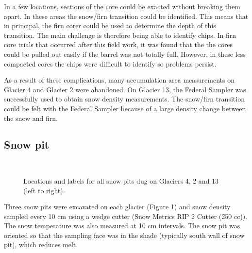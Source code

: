 \documentclass{sfuthesis}
\begin{document}
In a few locations, sections of the core could be exacted without breaking them apart. In these areas the snow/firn transition could be identified. This means that in principal, the firn corer could be used to determine the depth of this transition. The main challenge is therefore being able to identify chips. In firn core trials that occurred after this field work, it was found that the the cores could be pulled out easily if the barrel was not totally full. However, in these less compacted cores the chips were difficult to identify so problems persist. 

As a result of these complications, many accumulation area measurements on Glacier 4 and Glacier 2 were abandoned. On Glacier 13, the Federal Sampler was successfully used to obtain snow density measurements. The snow/firn transition could be felt with the Federal Sampler because of a large density change between the snow and firn.  

\subsection{Snow pit}
\label{sec:snowpit}

\begin{figure}
	\centering
	\\
	\caption{Locations and labels for all snow pits dug on Glaciers 4, 2 and 13 (left to right).}
	\label{fig:snowpit_location_all}
	\end{figure}

Three snow pits were excavated on each glacier (Figure \ref{fig:snowpit_location_all}) and snow density sampled every 10 cm using a wedge cutter (Snow Metrics RIP 2 Cutter (250 cc)). The snow temperature was also measured at 10 cm intervals. The snow pit was oriented so that the sampling face was in the shade (typically south wall of snow pit), which reduces melt. 
\end{document}
